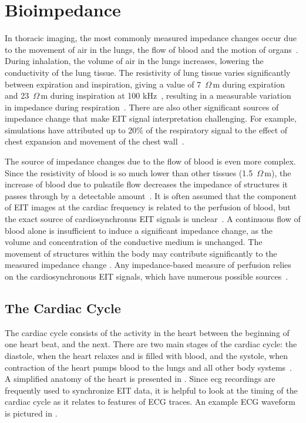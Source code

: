 \section{Bioimpedance}
\label{sec:bioimpedance}
In thoracic imaging, the most commonly measured 
impedance changes occur due to the movement 
of air in the lungs, the flow of blood and the motion of 
organs~\parencite{adler_electrical_2017}. 
During inhalation, the volume of air in the lungs increases, lowering the 
conductivity of the lung tissue. 
The resistivity of lung tissue varies significantly
between expiration and inspiration, giving a value of 7~$\Omega$\,m during expiration
and 23~$\Omega$\,m during inspiration at 100 kHz~\parencite{witsoe_electrical_1967},
resulting in a
measurable variation in impedance during respiration~\parencite{eyuboglu_vivo_1989}. 
There are also other 
significant sources of impedance change that make EIT signal interpretation 
challenging. For example, simulations have attributed up to 20\% 
of the respiratory signal to the effect of 
chest expansion and movement of the chest 
wall~\parencite{adler_impedance_1994}.

The source of impedance changes due to the flow of blood is even more complex. 
Since the resistivity of blood is so much lower than other tissues 
(1.5~$\Omega$\,m), the increase of blood due to pulsatile 
flow decreases the impedance of structures it passes through 
by a detectable amount~\parencite{eyuboglu_vivo_1989}.
It is often assumed that the component of EIT images at the cardiac 
frequency is related to the perfusion of blood, but the exact source of
cardiosynchronus EIT signals is 
unclear~\parencite{patterson_impedance_2010,nguyen_review_2012}.
A continuous flow of blood alone is insufficient 
to induce a significant impedance change, 
as the volume and concentration of the conductive medium is unchanged. 
The movement of structures within the body may contribute 
significantly to the measured impedance 
change \parencite{braun_limitations_2018}.
Any impedance-based measure of perfusion relies on the cardiosynchronous 
EIT signals, which have numerous possible sources~\parencite{adler_origins_2017}. 

\subsection{The Cardiac Cycle}
The cardiac cycle consists of the activity in the heart between the
beginning of one heart beat, and the next. There are two main stages 
of the cardiac cycle: the diastole, when the heart relaxes and is filled 
with blood, and the systole, when contraction of the heart pumps blood to
the lungs and all other body systems~\parencite{pappano_cardiovascular_2019}. 
A simplified anatomy of the heart is 
presented in . 
Since \acrshort{ecg} recordings are frequently used to synchronize 
EIT data, it is helpful to look at the timing of the cardiac cycle as it 
relates to features of ECG traces. An example ECG waveform is pictured in 
. 

